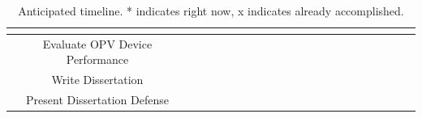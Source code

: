 \begin{table}[h]
{\begin{tabular}{|c|c|c|c|c|c|c|c|c|c|c|c|c|c|c|c|c|c|c|c|c|}
            & & & & & & & & & & & & & & \multicolumn{4}{|c|}{{\cellcolor{lgray}}}& & &\\
        \hline
        Evaluate OPV Device Performance 
            & & & & & & & & & & & & & & \multicolumn{4}{|c|}{{\cellcolor{lgray}}} & & &\\
        \hline
        Write Dissertation 
            & & & & & & & & & & & & & & & &\multicolumn{3}{|c|}{{\cellcolor{lgray}}} & &\\
        \hline
        Present Dissertation Defense  
            & & & & & & & & & & & & & & & & & & {\cellcolor{lgray}} &  &\\
        \hline
        \end{tabular}
    }
    \caption{Anticipated timeline. * indicates right now, x indicates already accomplished.}
\end{table}
